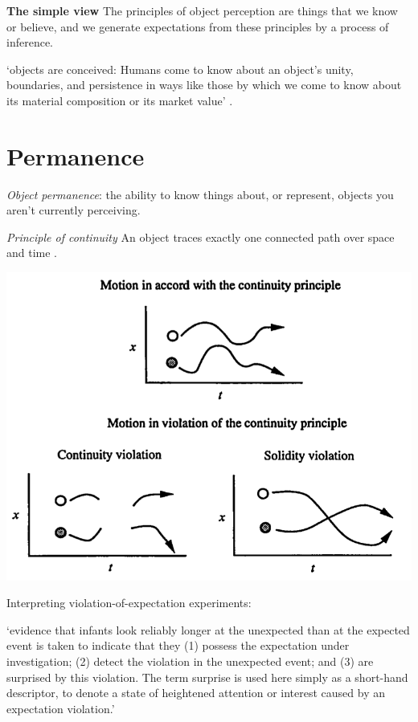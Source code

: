\documentclass[12pt]{extarticle}
\begin{document}
\begin{multicols}{3}
\textbf{The simple view}
The principles of object perception are things that we know or believe, 
and we generate expectations from these principles by a process of inference.
 
‘objects are conceived: Humans come to know about an object’s unity, boundaries, and 
persistence in ways like those by which we come to know about its material composition or its 
market value’
\citep[p.\ 198]{Spelke:1988xc}.
 
 
 
\section{Permanence}
 
\textit{Object permanence}:
the ability to know things about, or represent, objects you aren't currently perceiving.
 
\emph{Principle of continuity}  An object traces exactly one connected path over space and time \citep[p.\ 113]{spelke:1995_spatiotemporal}.
 
\begin{center}
\includegraphics[scale=0.3]{img/spelke_1995_fig1.neg.png}
\end{center}
 
Interpreting violation-of-expectation experiments:
 
‘evidence that infants look reliably longer at the unexpected than at the expected event is taken to indicate that they (1) possess the expectation under investigation; (2) detect the violation in the unexpected event; and (3) are surprised by this violation. The term surprise is used here simply as a short-hand descriptor, to denote a state of heightened attention or interest caused by an expectation violation.’
\citep[p.\ 168]{wang:2004_young}
 

\end{multicols}
\end{document}
